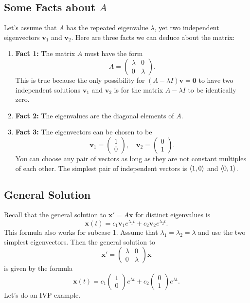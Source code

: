 \documentclass[11pt,letterpaper]{article}
\begin{document}

\subsection{Some Facts about $A$}
Let's assume that $A$ has the repeated eigenvalue $\lambda$, yet two independent eigenvectors $\textbf{v}_1$ and $\textbf{v}_2$. Here are three facts we can deduce about the matrix: 
\begin{enumerate}
    \item \textbf{Fact 1:} The matrix $A$ must have the form
    $$
        A=\begin{pmatrix}\lambda&0\\0&\lambda\end{pmatrix}.
    $$
    This is true because the only possibility for 
    $
    (A-\lambda I)\mathbf{v} = \mathbf{0}
    $
    to have two independent solutions $\textbf{v}_1$ and $\textbf{v}_2$ is for the matrix $A-\lambda I$ to be identically zero. 
    \item \textbf{Fact 2:} The eigenvalues are the diagonal elements of $A$.
    \item \textbf{Fact 3:} The eigenvectors can be chosen to be 
    $$
        \textbf{v}_1=\begin{pmatrix}
            1\\0
        \end{pmatrix}, \quad   \textbf{v}_2=\begin{pmatrix}
            0\\1
        \end{pmatrix}.
    $$
    You can choose any pair of vectors as long as they are not constant multiples of each other. The simplest pair of independent vectors is $\left\langle 1,0\right\rangle$ and $\left\langle 0,1\right\rangle$.
    
\end{enumerate}


\subsection{General Solution}
Recall that the general solution to $\textbf{x}'=A\textbf{x}$ for distinct eigenvalues is 
$$
    \textbf{x}(t) = c_1 \textbf{v}_1 e^{\lambda_1 t} + c_2 \textbf{v}_2 e^{\lambda_2 t}.
$$
This formula also works for subcase 1. Assume that $\lambda_1=\lambda_2=\lambda$ and use the two simplest eigenvectors. Then the general solution to 
$$
    \textbf{x}' = \begin{pmatrix}
        \lambda & 0\\
        0 & \lambda 
    \end{pmatrix}\textbf{x}
$$
is given by the formula 
$$
    \textbf{x}(t) = c_1 \begin{pmatrix}
        1\\0
    \end{pmatrix} e^{\lambda t} + c_2 \begin{pmatrix}
        0\\1
    \end{pmatrix} e^{\lambda t}.
$$
Let's do an IVP example.
\end{document}
